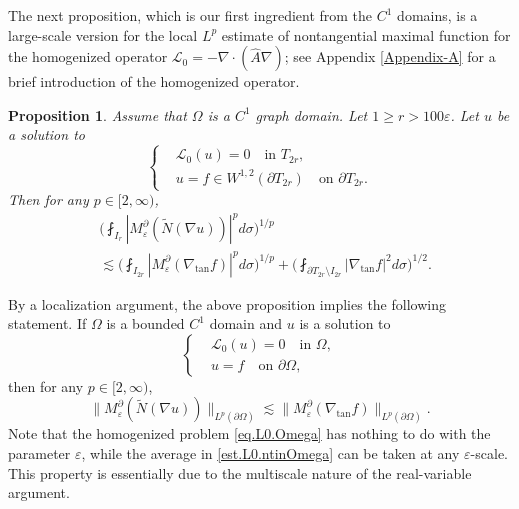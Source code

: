 \documentclass[reqno,12pt]{amsart} %
\newtheorem{proposition}[theorem]{Proposition}
\theoremstyle{definition}
\theoremstyle{remark}
\numberwithin{equation}{section}
\newcommand{\cL}{\mathcal{L}}
\newcommand{\e}{\varepsilon}
\begin{document}
The next proposition, which is our first ingredient from the $C^1$ domains, is a large-scale version for the local $L^p$ estimate of nontangential maximal function for the homogenized operator $\cL_0 = -\nabla\cdot (\widehat{A}\nabla)$; see Appendix \ref{Appendix-A} for a brief introduction of the homogenized operator.

\begin{proposition}\label{prop.L0.averageNT}
    Assume that $\Omega$ is a $C^1$ graph domain. Let $1\ge r > 100\e$.
    Let $u$ be a solution to
    \begin{equation}\label{eq.L0.T2r}
    \left\{
    \begin{aligned}
        & \cL_0(u) = 0 \quad \text{in } T_{2r}, \\
        & u = f \in W^{1,2}(\partial T_{2r}) \quad \text{on } \partial T_{2r}.
    \end{aligned}
    \right.
    \end{equation}
    Then for any $p\in [2,\infty)$,
    \begin{equation}\label{est.L0.nt}
     \begin{aligned}
        & \bigg( \fint_{I_r} |M_{\e}^\partial (\widetilde{N}(\nabla u))|^p d\sigma \bigg)^{1/p} \\
        & \lesssim \bigg( \fint_{I_{2r}} |M_\e^\partial(\nabla_{\tan} f)|^p d\sigma \bigg)^{1/p} + \bigg( \fint_{\partial T_{2r} \setminus I_{2r} } |\nabla_{\tan} f|^2 d\sigma \bigg)^{1/2}.
    \end{aligned}   
    \end{equation}
\end{proposition}

By a localization argument, the above proposition implies the following statement. If $\Omega$ is a bounded $C^1$ domain and $u$ is a solution to
    \begin{equation}\label{eq.L0.Omega}
    \left\{
    \begin{aligned}
        & \cL_0(u) = 0 \quad \text{in } \Omega, \\
        & u = f \quad \text{on } \partial \Omega,
    \end{aligned}
    \right.
    \end{equation}
then for any $p\in [2,\infty)$,
\begin{equation}\label{est.L0.ntinOmega}
    \| M_\e^\partial (\widetilde{N}(\nabla u)) \|_{L^p(\partial \Omega)} \lesssim \| M_\e^\partial (\nabla_{\tan} f) \|_{L^p(\partial \Omega)}.
\end{equation}
Note that the homogenized problem \eqref{eq.L0.Omega} has nothing to do with the parameter $\e$, while the average in \eqref{est.L0.ntinOmega} can be taken at any $\e$-scale. This property is essentially due to the multiscale nature of the real-variable argument. 
\end{document}
